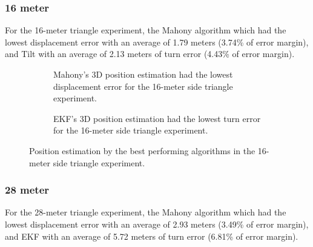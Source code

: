 \newpage

\subsubsection{16 meter}

For the 16-meter triangle experiment, the Mahony algorithm which had the lowest displacement error with an average of 1.79 meters (3.74\% of error margin), and Tilt with an average of 2.13 meters of turn error (4.43\% of error margin).

\vspace{-0.5cm}

\vspace{-1.5cm}

\begin{figure}[H]
    \centering
    \begin{subfigure}{0.49\textwidth}
        \centering
        \resizebox{1\linewidth}{!}{}
        \caption{Mahony's 3D position estimation had the lowest displacement error for the 16-meter side triangle experiment.}
        \label{fig:triangle16_2D}
    \end{subfigure}
    \begin{subfigure}{0.49\textwidth}
        \centering
        \resizebox{1\linewidth}{!}{}
        \caption{EKF's 3D position estimation had the lowest turn error for the 16-meter side triangle experiment.}
        \label{fig:triangle16_3D}
    \end{subfigure}
    \caption{Position estimation by the best performing algorithms in the 16-meter side triangle experiment.}
    \label{fig:triangle16}
\end{figure}

\subsubsection{28 meter}

For the 28-meter triangle experiment, the Mahony algorithm which had the lowest displacement error with an average of 2.93 meters (3.49\% of error margin), and EKF with an average of 5.72 meters of turn error (6.81\% of error margin).

\vspace{-0.5cm}

\vspace{-1.5cm}

